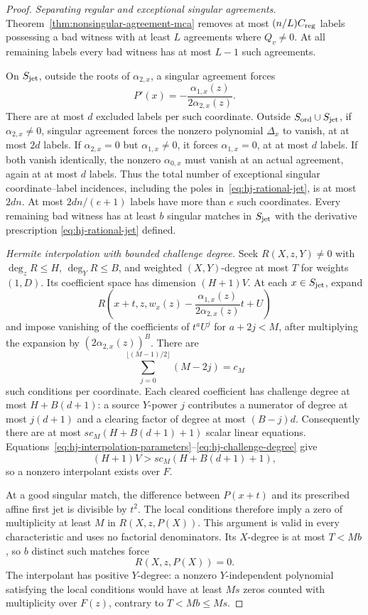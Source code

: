 \begin{proof}
\emph{Separating regular and exceptional singular agreements.}
Theorem~\ref{thm:nonsingular-agreement-mca} removes at most
$(n/L)C_{\rm reg}$ labels possessing a bad witness with at least $L$
agreements where $Q_v\ne0$.  At all remaining labels every bad witness
has at most $L-1$ such agreements.

On $S_{\rm jet}$, outside the roots of $\alpha_{2,x}$, a singular
agreement forces
\begin{equation}
 P'(x)=-\frac{\alpha_{1,x}(z)}{2\alpha_{2,x}(z)}.
 \label{eq:hj-rational-jet}
\end{equation}
There are at most $d$ excluded labels per such coordinate.  Outside
$S_{\rm ord}\cup S_{\rm jet}$, if $\alpha_{2,x}\ne0$, singular
agreement forces the nonzero polynomial $\Delta_x$ to vanish, at at
most $2d$ labels.  If $\alpha_{2,x}=0$ but $\alpha_{1,x}\ne0$, it
forces $\alpha_{1,x}=0$, at at most $d$ labels.  If both vanish
identically, the nonzero $\alpha_{0,x}$ must vanish at an actual
agreement, again at at most $d$ labels.  Thus the total number of
exceptional singular coordinate--label incidences, including the
poles in~\eqref{eq:hj-rational-jet}, is at most $2dn$.
At most $2dn/(e+1)$ labels have more than $e$ such coordinates.
Every remaining bad witness has at least $b$ singular matches in
$S_{\rm jet}$ with the derivative prescription
\eqref{eq:hj-rational-jet} defined.

\emph{Hermite interpolation with bounded challenge degree.}
Seek $R(X,z,Y)\ne0$ with $\deg_zR\le H$, $\deg_YR\le B$, and
weighted $(X,Y)$-degree at most $T$ for weights $(1,D)$.  Its
coefficient space has dimension $(H+1)V$.  At each $x\in S_{\rm jet}$,
expand
\[
 R\left(x+t,z,w_x(z)-
       \frac{\alpha_{1,x}(z)}{2\alpha_{2,x}(z)}t+U\right)
\]
and impose vanishing of the coefficients of $t^aU^j$ for $a+2j<M$,
after multiplying the expansion by $(2\alpha_{2,x}(z))^B$.
There are
\[
 \sum_{j=0}^{\lfloor(M-1)/2\rfloor}(M-2j)=c_M
\]
such conditions per coordinate.  Each cleared coefficient has challenge
degree at most $H+B(d+1)$: a source $Y$-power $j$ contributes a
numerator of degree at most $j(d+1)$ and a clearing factor of degree
at most $(B-j)d$.  Consequently there are at most
$sc_M(H+B(d+1)+1)$ scalar linear equations.
Equations~\eqref{eq:hj-interpolation-parameters}--\eqref{eq:hj-challenge-degree}
give
\[
 (H+1)V>sc_M(H+B(d+1)+1),
\]
so a nonzero interpolant exists over $F$.

At a good singular match, the difference between $P(x+t)$ and its
prescribed affine first jet is divisible by $t^2$.  The local
conditions therefore imply a zero of multiplicity at least $M$ in
$R(X,z,P(X))$.  This argument is valid in every characteristic and
uses no factorial denominators.  Its $X$-degree is at most $T<Mb$,
so $b$ distinct such matches force
\begin{equation}
 R(X,z,P(X))=0.
 \label{eq:hj-algebraic-root-identity}
\end{equation}
The interpolant has positive $Y$-degree: a nonzero $Y$-independent
polynomial satisfying the local conditions would have at least $Ms$
zeros counted with multiplicity over $F(z)$, contrary to $T<Mb\le Ms$.


\end{proof}
